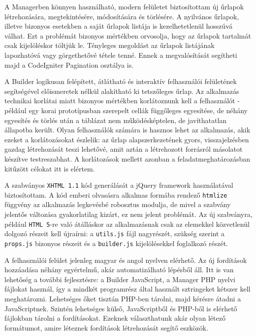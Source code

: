 \documentclass[12pt,a4paper,twoside]{article}
\begin{document}
A Managerben könnyen használható, modern felületet biztosítottam új űrlapok
létrehozására, megtekintésére, módosítására és törlésére. A nyilvános űrlapok,
illetve bizonyos esetekben a saját űrlapok listája is kezelhetetlenül hosszúvá
válhat. Ezt a problémát bizonyos mértékben orvosolja, hogy az űrlapok tartalmát
csak kijelöléskor töltjük le. Tényleges megoldást az űrlapok listájának
lapozhatóvá vagy görgethetővé tétele tenné. Ennek a megvalósítását segítheti
majd a CodeIgniter Pagination osztálya is.

A Builder logikusan felépített, átlátható és interaktív felhasználói felületének
segítségével előismeretek nélkül alakítható ki tetszőleges űrlap. Az alkalmazás
technikai korlátai miatt bizonyos mértékben korlátoznunk kell a felhasználót -
például egy korai prototípusban szerepelt cellák függőleges egyesítése, de
néhány egyesítés és törlés után a táblázat nem működésképtelen, de javíthatatlan
állapotba került. Olyan felhasználók számára is hasznos lehet az alkalmazás,
akik ezeket a korlátozásokat észlelik: az űrlap alapszerkezetének gyors,
visszajelzésben gazdag létrehozását teszi lehetővé, amit aztán a létrehozott
forrásról másolatot készítve testreszabhat. A korlátozások mellett azonban a
feladatmeghatározásban kitűzött célokat itt is elértem.

A szabványos \texttt{XHTML 1.1} kód generálását a jQuery framework használatával
biztosítottam. A kód emberi olvasásra alkalmas formába rendező \texttt{htmlize}
függvény az alkalmazás legkevésbé robosztus modulja, de mivel a szabvány
jelentős változása gyakorlatilag kizárt, ez nem jelent problémát. Az új
szabványra, például \texttt{HTML 5}-re való átálláskor az alkalmazásnak csak az
elemekkel közvetlenül dolgozó részeit kell újraírni: a \texttt{utils.js} fájl
nagyrészét, szükség szerint a \texttt{props.js} bizonyos részeit és a
\texttt{builder.js} kijelölésekkel foglalkozó részét.

A felhasználói felület jelenleg magyar és angol nyelven elérhető. Az új fordítások
hozzáadása néhány egyértelmű, akár automatizálható lépésből áll. Itt is van
lehetőség a további fejlesztésre: a Builder JavaScript, a Manager PHP nyelvi
fájlokat használ, így a mindkét programrész által használt sztringeket kétszer
kell meghatározni. Lehetséges őket tisztán PHP-ben tárolni, majd kérésre átadni
a JavaScriptnek. Szintén lehetséges külső, JavaScriptből és PHP-ből is elérhető
fájlokban tárolni a fordításokat. Ezeknek választhatunk akár olyan létező
formátumot, amire léteznek fordítások létrehozását segítő eszközök.
\end{document}
